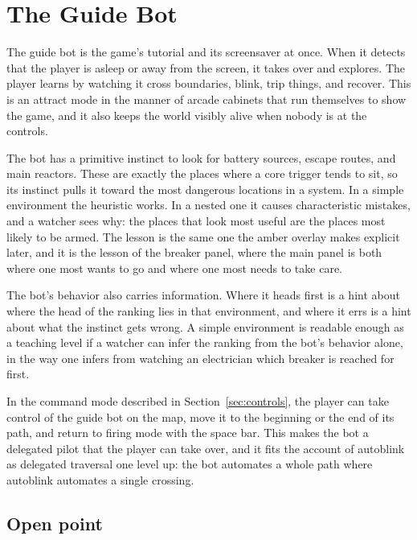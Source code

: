 \documentclass[11pt]{article}
\begin{document}
\section{The Guide Bot}

The guide bot is the game's tutorial and its screensaver at once. When it detects that the player is asleep or away from the screen, it takes over and explores. The player learns by watching it cross boundaries, blink, trip things, and recover. This is an attract mode in the manner of arcade cabinets that run themselves to show the game, and it also keeps the world visibly alive when nobody is at the controls.

The bot has a primitive instinct to look for battery sources, escape routes, and main reactors. These are exactly the places where a core trigger tends to sit, so its instinct pulls it toward the most dangerous locations in a system. In a simple environment the heuristic works. In a nested one it causes characteristic mistakes, and a watcher sees why: the places that look most useful are the places most likely to be armed. The lesson is the same one the amber overlay makes explicit later, and it is the lesson of the breaker panel, where the main panel is both where one most wants to go and where one most needs to take care.

The bot's behavior also carries information. Where it heads first is a hint about where the head of the ranking lies in that environment, and where it errs is a hint about what the instinct gets wrong. A simple environment is readable enough as a teaching level if a watcher can infer the ranking from the bot's behavior alone, in the way one infers from watching an electrician which breaker is reached for first.

In the command mode described in Section~\ref{sec:controls}, the player can take control of the guide bot on the map, move it to the beginning or the end of its path, and return to firing mode with the space bar. This makes the bot a delegated pilot that the player can take over, and it fits the account of autoblink as delegated traversal one level up: the bot automates a whole path where autoblink automates a single crossing.

\subsection{Open point}
\end{document}
